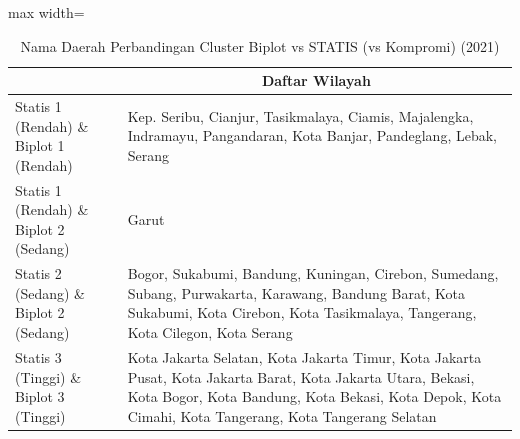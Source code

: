 \begin{table}[H]
\centering
\caption{Nama Daerah Perbandingan Cluster Biplot vs STATIS (vs Kompromi) (2021)} \label{tab:app2biplot_statis_name_2021}
\begin{adjustbox}{max width=\textwidth}
\begin{tabular}{|>{\centering\arraybackslash}p{4cm}|p{10cm}|}
\hline
\multicolumn{1}{|c|}{\textbf{Kategori}} & \multicolumn{1}{c|}{\textbf{Daftar Wilayah}} \\
\hline
Statis 1 (Rendah) \& Biplot 1 (Rendah) & Kep. Seribu, Cianjur, Tasikmalaya, Ciamis, Majalengka, Indramayu, Pangandaran, Kota Banjar, Pandeglang, Lebak, Serang \\
\hline
Statis 1 (Rendah) \& Biplot 2 (Sedang) & Garut \\
\hline
Statis 2 (Sedang) \& Biplot 2 (Sedang) & Bogor, Sukabumi, Bandung, Kuningan, Cirebon, Sumedang, Subang, Purwakarta, Karawang, Bandung Barat, Kota Sukabumi, Kota Cirebon, Kota Tasikmalaya, Tangerang, Kota Cilegon, Kota Serang \\
\hline
Statis 3 (Tinggi) \& Biplot 3 (Tinggi) & Kota Jakarta Selatan, Kota Jakarta Timur, Kota Jakarta Pusat, Kota Jakarta Barat, Kota Jakarta Utara, Bekasi, Kota Bogor, Kota Bandung, Kota Bekasi, Kota Depok, Kota Cimahi, Kota Tangerang, Kota Tangerang Selatan \\
\hline
\end{tabular}
\end{adjustbox}
\end{table}
